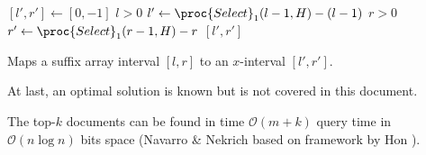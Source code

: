 \begin{Proof}
  \begin{algorithm}[htb]
    \begin{codebox}
      \li $[l', r'] \gets [0, -1]$
      \li \If $l > 0$
          \Then
      \li   $l' \gets \proc{Select}_1(l - 1, H) - (l - 1)$
          \End
      \li \If $r > 0$
          \Then
      \li   $r' \gets \proc{Select}_1(r - 1, H) - r$
          \End
      \li \Return $[l', r']$
    \end{codebox}
    \caption{Maps a suffix array interval $[l,r]$ to an $x$-interval $[l',r']$.}
    \label{alg:singleTermFrequencyMapInterval}
  \end{algorithm}
\end{Proof}

At last, an optimal solution is known but is not covered in this document.

\begin{Theorem}
  The top-$k$ documents can be found in time $\mathcal{O}(m + k)$ query time in $\mathcal{O}(n \log n)$ bits space (Navarro \& Nekrich \cite{Navarro2012} based on framework by Hon \cite{Hon2014}).
\end{Theorem}
